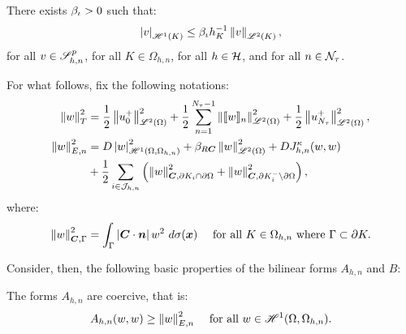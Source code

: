 \begin{lemma}
    There exists $\beta_{\iota} > 0$ such that:
    \begin{align}
        \left\lvert v \right\rvert_{\mathscr{H}^{1}(K)} \leq \beta_{\iota} h_K^{-1} \left\lVert v \right\rVert_{\mathscr{L}^{2}(K)},
    \end{align}
    for all $v \in \mathscr{S}^p_{h, n}$, for all $K \in \Omega_{h, n}$, for all $h \in \mathcal{H}$, and for all $n \in \mathcal{N}_{\tau}$.
\end{lemma}

For what follows, fix the following notations:
\begin{align} %
    \left\lVert w \right\rVert_{T}^2 &= \frac{1}{2} \left\lVert u_0^+ \right\rVert_{\SpaceLp{2}(\Omega)}^2 + \frac{1}{2} \sum_{n = 1}^{\nTimeIndices - 1} \left\lVert \Jump{w}_n \right\rVert_{\SpaceLp{2}(\Omega)}^2 + \frac{1}{2} \left\lVert u_{\nTimeIndices}^+ \right\rVert_{\SpaceLp{2}(\Omega)}^2, \\
    \left\lVert w \right\rVert_{E, n}^2 &= \Diffusion \left\lvert w \right\rvert_{\SpaceHk{1}(\Omega, \Omega_{h, n})}^2 + \BoundC{\Reaction \Convection} \left\lVert w \right\rVert_{\SpaceLp{2}(\Omega)}^2 + \Diffusion J^{\kappa}_{h, n}(w, w) \\
    &+ \frac{1}{2} \sum_{i \in \SpaceTimeIndices} \left( \left\lVert w \right\rVert_{\Convection, \partial K_i \cap \partial \Omega}^2 + \left\lVert w \right\rVert_{\Convection, \partial K_i^- \setminus \partial \Omega}^2 \right), \notag
\end{align}
where:
\begin{align}
    \left\lVert w \right\rVert_{\bm{C}, \Gamma}^2 &= \int_{\Gamma} \left\lvert \bm{C} \cdot \bm{n} \right\rvert w^2 ~ d \sigma(\bm{x}) &\text{ for all } K \in \Omega_{h, n} \text{ where } \Gamma \subset \partial K.
\end{align}

Consider, then, the following basic properties of the bilinear forms $A_{h, n}$ and $B$:

\begin{lemma}[Coercivity of $A_{h, n}$] \label{lemma:A_coercivity}
    The forms $A_{h, n}$ are coercive, that is:
    \begin{align}
        A_{h, n}(w, w) &\geq \left\lVert w \right\rVert_{E, n}^2 &\text{ for all } w \in \mathscr{H}^{1}(\Omega, \Omega_{h, n}).
    \end{align}
\end{lemma}

